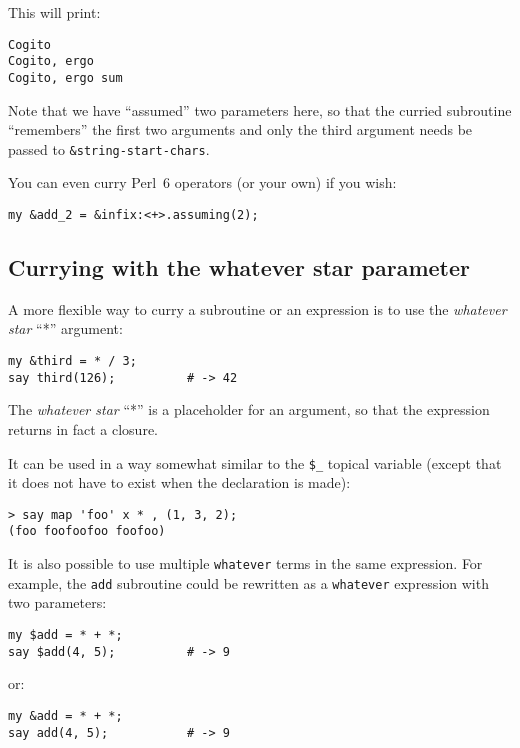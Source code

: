 This will print:

\begin{verbatim}
Cogito
Cogito, ergo
Cogito, ergo sum
\end{verbatim}

Note that we have ``assumed'' two parameters here, so 
that the curried subroutine ``remembers'' the first 
two arguments and only the third argument needs be 
passed to \verb'&string-start-chars'.

You can even curry Perl~6 operators (or your own) if 
you wish:

\begin{verbatim}
my &add_2 = &infix:<+>.assuming(2);
\end{verbatim}

\subsection{Currying with the whatever star parameter}
\label{whatever star parameter}

A more flexible way to curry a subroutine or an expression 
is to use the \emph{whatever star} ``*'' argument:

\begin{verbatim}
my &third = * / 3; 
say third(126);          # -> 42
\end{verbatim}

The \emph{whatever star} ``*'' is a placeholder for 
an argument, so that the expression returns in fact 
a closure.

It can be used in a way somewhat similar to the \verb'$_' 
topical variable (except that it does not have to exist 
when the declaration is made):

\begin{verbatim}
> say map 'foo' x * , (1, 3, 2);
(foo foofoofoo foofoo)
\end{verbatim}

It is also possible to use multiple {\tt whatever} terms 
in the same expression. For example, the {\tt add} 
subroutine could be rewritten as a {\tt whatever} 
expression with two parameters:

\begin{verbatim}
my $add = * + *;
say $add(4, 5);          # -> 9
\end{verbatim}

or:

\begin{verbatim}
my &add = * + *;
say add(4, 5);           # -> 9
\end{verbatim}

